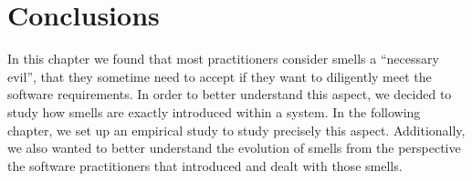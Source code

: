 \section{Conclusions}
In this chapter we found that most practitioners consider smells a ``necessary evil'', that they sometime need to accept if they want to diligently meet the software requirements.
In order to better understand this aspect, we decided to study how smells are exactly introduced within a system.
In the following chapter, we set up an empirical study to study precisely this aspect.
Additionally, we also wanted to better understand the evolution of smells from the perspective the software practitioners that introduced and dealt with those smells.